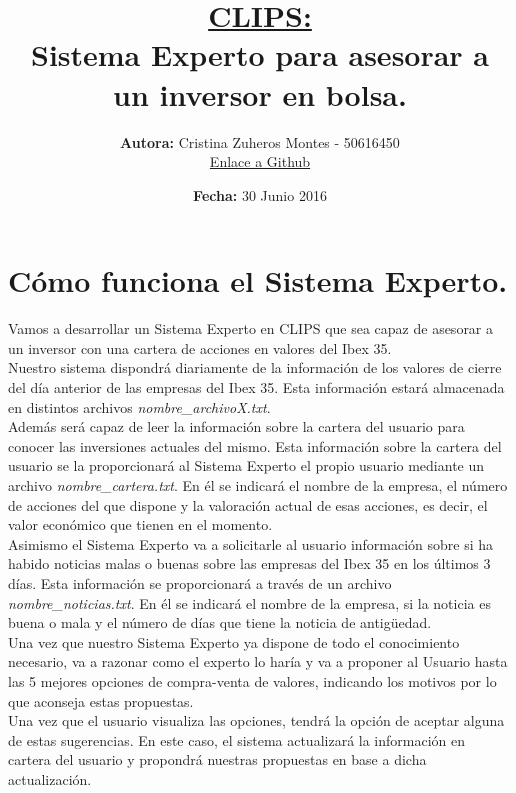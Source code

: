 \documentclass[12pt]{article}
\title{\textbf{\underline{CLIPS:}\\
		 Sistema Experto para asesorar a un	inversor en bolsa.}}
\author{\textbf{ Autora:} Cristina Zuheros Montes - 50616450\\
	    \href{https://github.com/cristinazuhe}{Enlace a Github}}
\date{\textbf{Fecha:} 30 Junio 2016}
\begin{document}
\maketitle

\tableofcontents

\newpage
\section{Cómo funciona el Sistema Experto. }\label{PrimeraSeccion}
 Vamos a desarrollar un Sistema Experto en CLIPS que sea capaz de asesorar a un inversor con una cartera de acciones en valores del Ibex 35.\\
 
 Nuestro sistema dispondrá diariamente de la información de los valores de cierre del día anterior de las empresas del Ibex 35. Esta información estará almacenada en distintos archivos \textit{nombre\_archivoX.txt}.\\
 
 Además será capaz de leer la información sobre la cartera del usuario para conocer las inversiones actuales del mismo. Esta información sobre la cartera del usuario se la proporcionará al Sistema Experto el propio usuario mediante un archivo \textit{nombre\_cartera.txt}. En él se indicará el nombre de la empresa, el número de acciones del que dispone y la valoración actual de esas acciones, es decir, el valor económico que tienen en el momento. \\
 
 Asimismo el Sistema Experto va a solicitarle al usuario información sobre si ha habido noticias malas o buenas sobre las empresas del Ibex 35 en los últimos 3 días. Esta información se proporcionará a través de un archivo \textit{nombre\_noticias.txt}. En él se indicará el nombre de la empresa, si la noticia es buena o mala y el número de días que tiene la noticia de antigüedad. \\
 
 Una vez que nuestro Sistema Experto ya dispone de todo el conocimiento necesario, va a razonar como el experto lo haría y va a proponer al Usuario hasta las 5 mejores opciones de compra-venta de valores, indicando los motivos por lo que aconseja estas propuestas. \\
 
 Una vez que el usuario visualiza las opciones, tendrá la opción de aceptar alguna de estas sugerencias. En este caso, el sistema actualizará la información en cartera del usuario y propondrá nuestras propuestas en base a dicha actualización. 
 
\end{document}
